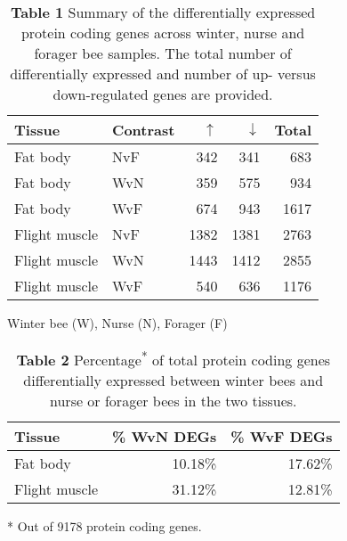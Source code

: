 \documentclass[landscape, 12pt]{article}
\begin{document}
\begin{table}
\centering
\begin{threeparttable}
\caption*{\textbf{Table 1}	\quad Summary of the differentially expressed protein coding genes across winter, nurse and forager bee samples. The total number of differentially expressed and number of up- versus down-regulated genes are provided.}
\begin{tabular}{llrrr} 
\rowcolor[rgb]{0.804,0.8,0.8} \textbf{Tissue} & \textbf{Contrast} & \textbf{$\uparrow$} & \textbf{$\downarrow$} & \textbf{Total}  \\ 
\hline
Fat body & NvF & 342 & 341 & 683 \\
Fat body & WvN & 359 & 575 & 934 \\
Fat body & WvF & 674 & 943 & 1617 \\
Flight muscle & NvF & 1382 & 1381 & 2763 \\
Flight muscle & WvN & 1443 & 1412 & 2855 \\
Flight muscle & WvF & 540 & 636 & 1176 \\
\hline
\end{tabular}
\begin{tablenotes}
	\item[] Winter bee (W), Nurse (N), Forager (F)
\end{tablenotes}
\end{threeparttable}
\end{table}

\pagebreak

\begin{table}
\centering
\begin{threeparttable}
\caption*{\textbf{Table 2}	\quad Percentage\textsuperscript{*} of total protein coding genes differentially expressed between winter bees and nurse or forager bees in the two tissues.}
\begin{tabular}{lrr} 
\rowcolor[rgb]{0.804,0.8,0.8} \textbf{Tissue} & \textbf{\% WvN DEGs} & \textbf{\% WvF DEGs} \\ 
\hline
Fat body & 10.18\% & 17.62\% \\
Flight muscle & 31.12\% & 12.81\% \\
\hline
\end{tabular}
\begin{tablenotes}
	\item[*] Out of 9178 protein coding genes.
\end{tablenotes}
\end{threeparttable}
\end{table}
\end{document}
